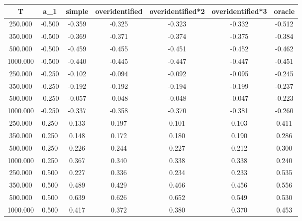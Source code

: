 % 
\begin{tabular}{ccccccc}
  \hline
T & a\_1 & simple & overidentified & overidentified*2 & overidentified*3 & oracle \\ 
  \hline
250.000 & -0.500 & -0.359 & -0.325 & -0.323 & -0.332 & -0.512 \\ 
  350.000 & -0.500 & -0.369 & -0.371 & -0.374 & -0.375 & -0.384 \\ 
  500.000 & -0.500 & -0.459 & -0.455 & -0.451 & -0.452 & -0.462 \\ 
  1000.000 & -0.500 & -0.440 & -0.445 & -0.447 & -0.447 & -0.451 \\ 
  250.000 & -0.250 & -0.102 & -0.094 & -0.092 & -0.095 & -0.245 \\ 
  350.000 & -0.250 & -0.192 & -0.192 & -0.194 & -0.199 & -0.237 \\ 
  500.000 & -0.250 & -0.057 & -0.048 & -0.048 & -0.047 & -0.223 \\ 
  1000.000 & -0.250 & -0.337 & -0.358 & -0.370 & -0.381 & -0.260 \\ 
  250.000 & 0.250 & 0.133 & 0.197 & 0.101 & 0.103 & 0.411 \\ 
  350.000 & 0.250 & 0.148 & 0.172 & 0.180 & 0.190 & 0.286 \\ 
  500.000 & 0.250 & 0.226 & 0.244 & 0.227 & 0.212 & 0.300 \\ 
  1000.000 & 0.250 & 0.367 & 0.340 & 0.338 & 0.338 & 0.240 \\ 
  250.000 & 0.500 & 0.227 & 0.336 & 0.234 & 0.233 & 0.535 \\ 
  350.000 & 0.500 & 0.489 & 0.429 & 0.466 & 0.456 & 0.556 \\ 
  500.000 & 0.500 & 0.639 & 0.626 & 0.652 & 0.549 & 0.530 \\ 
  1000.000 & 0.500 & 0.417 & 0.372 & 0.380 & 0.370 & 0.453 \\ 
   \hline
\end{tabular}
